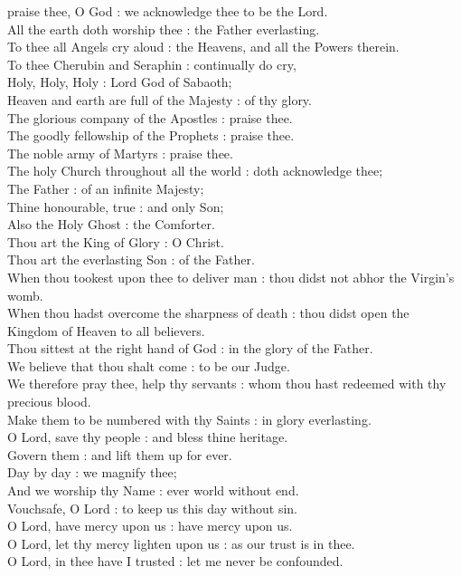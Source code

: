  praise thee, O God : we acknowledge thee to be the Lord.\\
All the earth doth worship thee : the Father everlasting.\\
To thee all Angels cry aloud : the Heavens, and all the Powers therein.\\
To thee Cherubin and Seraphin : continually do cry,\\
Holy, Holy, Holy : Lord God of Sabaoth;\\
Heaven and earth are full of the Majesty : of thy glory.\\
The glorious company of the Apostles : praise thee.\\
The goodly fellowship of the Prophets : praise thee.\\
The noble army of Martyrs : praise thee.\\
The holy Church throughout all the world : doth acknowledge thee;\\
The Father : of an infinite Majesty;\\
Thine honourable, true : and only Son;\\
Also the Holy Ghost : the Comforter.\\
Thou art the King of Glory : O Christ.\\
Thou art the everlasting Son : of the Father.\\
When thou tookest upon thee to deliver man : thou didst not abhor the Virgin's womb.\\
When thou hadst overcome the sharpness of death : thou didst open the Kingdom of Heaven to all believers.\\
Thou sittest at the right hand of God : in the glory of the Father.\\
We believe that thou shalt come : to be our Judge.\\
We therefore pray thee, help thy servants : whom thou hast redeemed with thy precious blood.\\
Make them to be numbered with thy Saints : in glory everlasting.\\
O Lord, save thy people : and bless thine heritage.\\
Govern them : and lift them up for ever.\\
Day by day : we magnify thee;\\
And we worship thy Name : ever world without end.\\
Vouchsafe, O Lord : to keep us this day without sin.\\
O Lord, have mercy upon us : have mercy upon us.\\
O Lord, let thy mercy lighten upon us : as our trust is in thee.\\
O Lord, in thee have I trusted : let me never be confounded.

